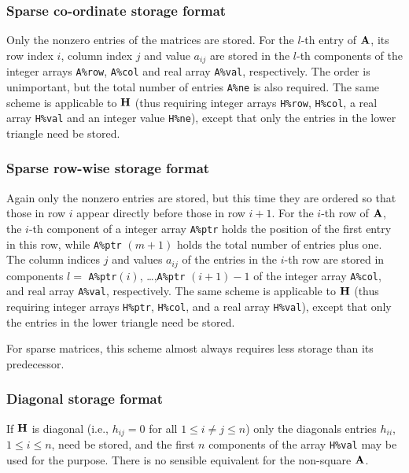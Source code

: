 \documentclass{galahad}
\begin{document}
\subsubsection{Sparse co-ordinate storage format}\label{coordinate}
Only the nonzero entries of the matrices are stored. For the
$l$-th entry of ${\mathbf{A}}$, its row index $i$, column index $j$
and value $a_{ij}$
are stored in the $l$-th components of the integer arrays {\tt A\%row},
{\tt A\%col} and real array {\tt A\%val}, respectively.
The order is unimportant, but the total
number of entries {\tt A\%ne} is also required.
The same scheme is applicable to
${\mathbf{H}}$ (thus requiring integer arrays {\tt H\%row}, {\tt H\%col}, a real array
{\tt H\%val} and an integer value {\tt H\%ne}),
except that only the entries in the lower triangle need be stored.

\subsubsection{Sparse row-wise storage format}\label{rowwise}
Again only the nonzero entries are stored, but this time
they are ordered so that those in row $i$ appear directly before those
in row $i+1$. For the $i$-th row of ${\mathbf{A}}$, the $i$-th component of a
integer array {\tt A\%ptr} holds the position of the first entry in this row,
while {\tt A\%ptr} $(m+1)$ holds the total number of entries plus one.
The column indices $j$ and values $a_{ij}$ of the entries in the $i$-th row
are stored in components
$l =$ {\tt A\%ptr}$(i)$, \ldots ,{\tt A\%ptr} $(i+1)-1$ of the
integer array {\tt A\%col}, and real array {\tt A\%val}, respectively.
The same scheme is applicable to
${\mathbf{H}}$ (thus requiring integer arrays {\tt H\%ptr}, {\tt H\%col}, and
a real array {\tt H\%val}),
except that only the entries in the lower triangle need be stored.

For sparse matrices, this scheme almost always requires less storage than
its predecessor.

\subsubsection{Diagonal storage format}\label{diagonal}
If ${\mathbf{H}}$ is diagonal (i.e., $h_{ij} = 0$ for all $1 \leq i \neq j \leq n$)
only the diagonals entries $h_{ii}$, $1 \leq i \leq n$,  need be stored,
and the first $n$ components of the array {\tt H\%val} may be used for
the purpose. There is no sensible equivalent for the non-square ${\mathbf{A}}$.

\end{document}
